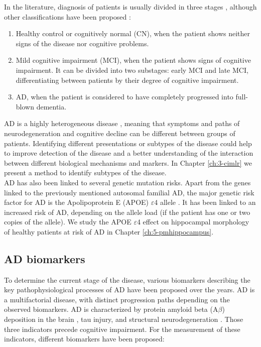 In the literature, diagnosis of patients is usually divided in three stages \cite{Brookmeyer2007}, although other classifications have been proposed \cite{Jack2018}:

\begin{enumerate}\itemsep5pt
\item Healthy control or cognitively normal (CN), when the patient shows neither signs of the disease nor cognitive problems.
\item Mild cognitive impairment (MCI), when the patient shows signs of cognitive impairment. It can be divided into two substages: early MCI and late MCI, differentiating between patients by their degree of cognitive impairment.
\item AD, when the patient is considered to have completely progressed into full-blown dementia.
\end{enumerate}

AD is a highly heterogeneous disease \cite{Lam2013}, meaning that symptoms and paths of neurodegeneration and cognitive decline can be different between groups of patients. Identifying different presentations or subtypes of the disease could help to improve detection of the disease and a better understanding of the interaction between different biological mechanisms and markers. In Chapter \ref{ch:3-cimlr} we present a method to identify subtypes of the disease. \\

AD has also been linked to several genetic mutation risks. Apart from the genes linked to the previously mentioned autosomal familial AD, the major genetic risk factor for AD is the Apolipoprotein E (APOE) $\varepsilon$4 allele \cite{Saunders1993}. It has been linked to an increased risk of AD, depending on the allele load \cite{Liu2013a} (if the patient has one or two copies of the allele). We study the APOE $\varepsilon$4 effect on hippocampal morphology of healthy patients at risk of AD in Chapter \ref{ch:5-pmhippocampus}.

\subsection{AD biomarkers}

To determine the current stage of the disease, various biomarkers describing the key pathophysiological processes of AD have been proposed over the years. AD is a multifactorial disease, with distinct progression paths depending on the observed biomarkers. AD is characterized by protein amyloid beta (A$\beta$) deposition in the brain \cite{Rissman2012}, tau injury, and structural neurodegeneration \cite{Jack2013}. Those three indicators precede cognitive impairment. For the measurement of these indicators, different biomarkers have been proposed:

